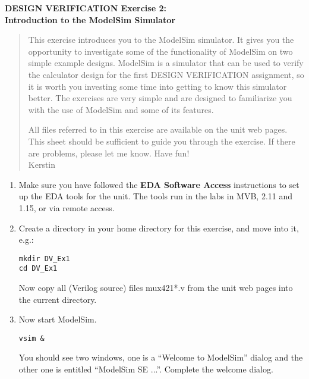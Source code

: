 \documentclass[a4paper,11pt]{article}
\begin{document}
\thispagestyle{empty}
\begin{center}
{\Large\bf DESIGN VERIFICATION Exercise 2: \\
\smallskip Introduction to the ModelSim Simulator}
\end{center}

\begin{quote}
  This exercise introduces you to the ModelSim simulator. It gives you the
  opportunity to investigate some of the functionality of ModelSim on two
  simple example designs. ModelSim is a simulator that can be used to verify
  the calculator design for the first DESIGN VERIFICATION assignment, so it is
  worth you investing some time into getting to know this simulator better. The
  exercises are very simple and are designed to familiarize you with the use of
  ModelSim and some of its features.
  
  All files referred to in this exercise are available on the unit web
  pages. This sheet should be sufficient to guide you through
  the exercise. If there are problems, please let me know. Have fun! \\
  \hspace*{125mm} Kerstin
\end{quote}

\smallskip
{}
\smallskip

\begin{enumerate}
\item Make sure you have followed the {\bf EDA Software Access} instructions to set up the EDA tools for the unit. The tools run in the labs in MVB, 2.11 and 1.15, or via remote access.

\item Create a directory in your home directory for this exercise, 
and move into it, e.g.:

\verb#mkdir DV_Ex1#\\
\verb#cd DV_Ex1#

Now copy all (Verilog source) files mux421*.v from the unit web pages 
into the current directory. 

\item Now start ModelSim.

\verb#vsim &#

You should see two windows, one is a ``Welcome to ModelSim'' dialog and the
other one is entitled ``ModelSim SE ...''.  Complete the welcome dialog.
\end{enumerate}

\smallskip
{}
\smallskip
\end{document}
